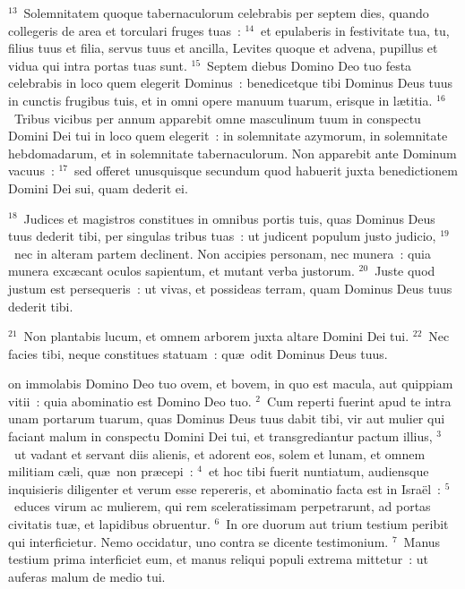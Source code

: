 ${}^{13}$~Solemnitatem quoque tabernaculorum celebrabis per septem dies, quando collegeris de area et torculari fruges tuas~:
${}^{14}$~et epulaberis in festivitate tua, tu, filius tuus et filia, servus tuus et ancilla, Levites quoque et advena, pupillus et vidua qui intra portas tuas sunt.
${}^{15}$~Septem diebus Domino Deo tuo festa celebrabis in loco quem elegerit Dominus~: benedicetque tibi Dominus Deus tuus in cunctis frugibus tuis, et in omni opere manuum tuarum, erisque in l\ae titia.
${}^{16}$~Tribus vicibus per annum apparebit omne masculinum tuum in conspectu Domini Dei tui in loco quem elegerit~: in solemnitate azymorum, in solemnitate hebdomadarum, et in solemnitate tabernaculorum. Non apparebit ante Dominum vacuus~:
${}^{17}$~sed offeret unusquisque secundum quod habuerit juxta benedictionem Domini Dei sui, quam dederit ei.


${}^{18}$~Judices et magistros constitues in omnibus portis tuis, quas Dominus Deus tuus dederit tibi, per singulas tribus tuas~: ut judicent populum justo judicio,
${}^{19}$~nec in alteram partem declinent. Non accipies personam, nec munera~: quia munera exc\ae cant oculos sapientum, et mutant verba justorum.
${}^{20}$~Juste quod justum est persequeris~: ut vivas, et possideas terram, quam Dominus Deus tuus dederit tibi.


${}^{21}$~Non plantabis lucum, et omnem arborem juxta altare Domini Dei tui.
${}^{22}$~Nec facies tibi, neque constitues statuam~: qu\ae\ odit Dominus Deus tuus.

\bchapter
{}on immolabis Domino Deo tuo ovem, et bovem, in quo est macula, aut quippiam vitii~: quia abominatio est Domino Deo tuo.
${}^{2}$~Cum reperti fuerint apud te intra unam portarum tuarum, quas Dominus Deus tuus dabit tibi, vir aut mulier qui faciant malum in conspectu Domini Dei tui, et transgrediantur pactum illius,
${}^{3}$~ut vadant et servant diis alienis, et adorent eos, solem et lunam, et omnem militiam c\ae li, qu\ae\ non pr\ae cepi~:
${}^{4}$~et hoc tibi fuerit nuntiatum, audiensque inquisieris diligenter et verum esse repereris, et abominatio facta est in Isra\"el~:
${}^{5}$~educes virum ac mulierem, qui rem sceleratissimam perpetrarunt, ad portas civitatis tu\ae , et lapidibus obruentur.
${}^{6}$~In ore duorum aut trium testium peribit qui interficietur. Nemo occidatur, uno contra se dicente testimonium.
${}^{7}$~Manus testium prima interficiet eum, et manus reliqui populi extrema mittetur~: ut auferas malum de medio tui.


